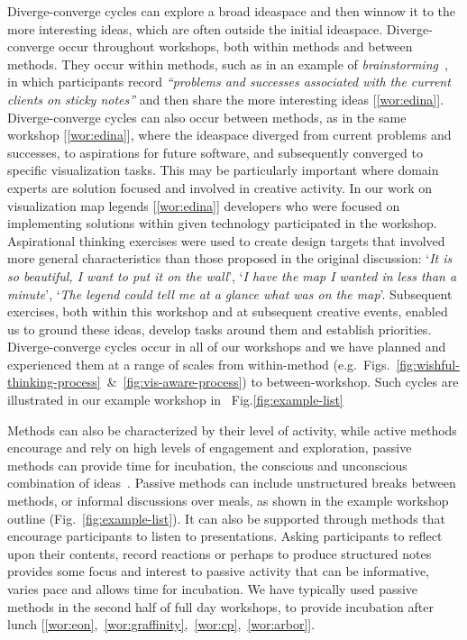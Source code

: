 Diverge-converge cycles can explore a broad ideaspace and then winnow it to the more interesting ideas, which are often outside the initial ideaspace. Diverge-converge occur throughout workshops, both within methods and between methods. They occur within methods, such as in an example of \emph{brainstorming}~\cite{Osborn1953}, in which participants record \emph{``problems and successes associated with the current clients on sticky notes''} and then share the more interesting ideas [\ref{wor:edina}]. Diverge-converge cycles can also occur between methods, as in the same workshop [\ref{wor:edina}], where the ideaspace diverged from current problems and successes, to aspirations for future software, and subsequently converged to specific visualization tasks. This may be particularly important where domain experts are solution focused and involved in creative activity. In our work on visualization map legends [\ref{wor:edina}] developers who were focused on implementing solutions within given technology participated in the workshop. Aspirational thinking exercises were used to create design targets that involved more general characteristics than those proposed in the original discussion: `\emph{It is so beautiful, I want to put it on the wall}', `\emph{I have the map I wanted in less than a minute}', `\emph{The legend could tell me at a glance what was on the map}'. Subsequent exercises, both within this workshop and at subsequent creative events, enabled us to ground these ideas, develop tasks around them and establish priorities.   Diverge-converge cycles occur in all of our workshops and we have planned and experienced them at a range of scales from within-method (e.g.~Figs.~\ref{fig:wishful-thinking-process}~\&~\ref{fig:vis-aware-process}) to between-workshop. Such cycles are illustrated in our example workshop in ~Fig.\ref{fig:example-list} 

Methods can also be characterized by their level of activity, while active methods encourage and rely on high levels of engagement and exploration, passive methods can provide time for incubation, the conscious and unconscious combination of ideas~\cite{Sawyer2006}. Passive methods can include unstructured breaks between methods, or informal discussions over meals, as shown in the example workshop outline (Fig.~\ref{fig:example-list}). It can also be supported through methods that encourage participants to listen to presentations. Asking participants to reflect upon their contents, record reactions or perhaps to produce structured notes provides some focus and interest to passive activity that can be informative, varies pace and allows time for incubation. We have typically used passive methods in the second half of full day workshops, to provide incubation after lunch [\ref{wor:eon},~\ref{wor:graffinity},~\ref{wor:cp},~\ref{wor:arbor}].


